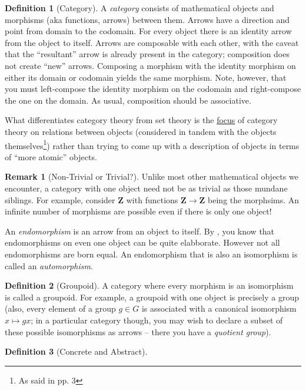 \documentclass{scrbook}
\theoremstyle{definition}\newtheorem{defn}{Definition}
\theoremstyle{definition}\newtheorem*{rmk}{Remark}
\newcommand{\Z}{\mathbf{Z}}
\begin{document}
\begin{defn}[Category]
  A \emph{category} consists of mathematical objects and morphisms (aka
  functions, arrows) between them.
   Arrows have a direction and point from domain to the codomain. For
  every object there is an identity arrow from the object to itself. Arrows are
  composable with each other, with the caveat that the ``resultant'' arrow is
  already present in the category; composition does not create ``new''
  arrows. Composing a morphism with the identity morphism on either its
  domain or codomain yields the same morphism. Note, however, that you must
  left-compose the identity morphism on the codomain and right-compose the one
  on the domain. As usual, composition should be associative.
\end{defn}

What differentiates category theory from set theory is the
\href{https://ncatlab.org/nlab/show/category+theory}{focus} of category theory
on relations between objects (considered in tandem with the objects
themselves\footnote{As said in \cite{riehl2017category} pp. 3}) rather than
trying to come up with a description of objects in terms of ``more atomic''
objects.

\begin{rmk}[Non-Trivial or Trivial?]
  \label{s1}
  Unlike most other mathematical objects we encounter, a category with one
  object need not be as trivial as those mundane siblings. For example, consider
  $\Z$ with functions $\Z \to \Z$ being the morphsims. An infinite number of
  morphisms are possible even if there is only one object!
\end{rmk}

An \emph{endomorphism} is an arrow from an object to itself. By
, you know that endomorphisms on even one object can be quite
elabborate. However not all endomorphisms are born equal. An endomorphism that
is also an isomorphism is called an \emph{automorphism}.

\begin{defn}[Groupoid]
  A category where every morphism is an isomorphism is called a groupoid.
  For example, a groupoid with one object is precisely a group (also, every
  element of a group $g \in G$ is associated with a canonical isomorphism
  $x \mapsto gx$; in a particular category though, you may wish to declare a
  subset of these possible isomorphisms as arrows -- there you have a
  \emph{quotient group}).
\end{defn}

\begin{defn}[Concrete and Abstract]

\end{defn}
\end{document}
